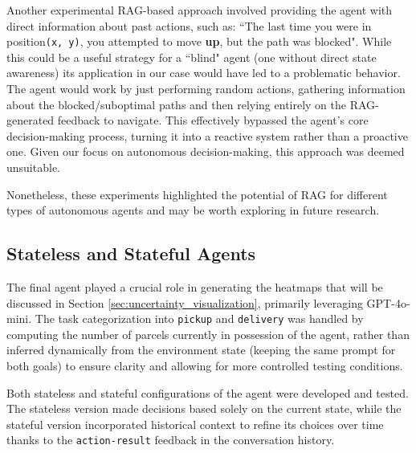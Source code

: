 Another experimental RAG-based approach involved providing the agent with direct
information about past actions, such as: ``The last time you were in position\texttt{(x,
y)}, you attempted to move \textbf{up}, but the path was blocked". While this
could be a useful strategy for a ``blind" agent (one without direct state
awareness) its application in our case would have led to a problematic behavior.
The agent would work by just performing random actions, gathering information about
the blocked/suboptimal paths and then relying entirely on the RAG-generated feedback
to navigate. This effectively bypassed the agent's core decision-making process,
turning it into a reactive system rather than a proactive one. Given our focus
on autonomous decision-making, this approach was deemed unsuitable.

Nonetheless, these experiments highlighted the potential of RAG for different
types of autonomous agents and may be worth exploring in future research.

\subsection{Stateless and Stateful Agents}
\label{sec:stateful_and_stateless_agents_chapAD}

The final agent played a crucial role in generating the heatmaps that will be discussed
in Section \ref{sec:uncertainty_visualization}, primarily leveraging GPT-4o-mini.
The task categorization into \texttt{pickup} and \texttt{delivery} was handled by
computing the number of parcels currently in possession of the agent, rather
than inferred dynamically from the environment state (keeping the same prompt for
both goals) to ensure clarity and allowing for more controlled testing
conditions.

Both stateless and stateful configurations of the agent were developed and
tested. The stateless version made decisions based solely on the current state,
while the stateful version incorporated historical context to refine its choices
over time thanks to the \texttt{action-result} feedback in the conversation history.

